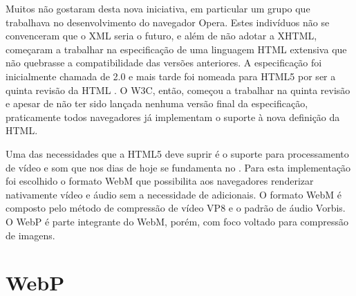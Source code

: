 \documentclass[espaco=simples,appendix=Name]{abnt}
\begin{document}
\begin{description}
Muitos não gostaram desta nova iniciativa, em particular um grupo que trabalhava no desenvolvimento do navegador Opera. Estes indivíduos não se convenceram que o XML seria o futuro, e além de não adotar a XHTML, começaram a trabalhar na especificação de uma linguagem HTML extensiva que não quebrasse a compatibilidade das versões anteriores.  A especificação foi inicialmente chamada de  2.0 e mais tarde foi nomeada para HTML5 por ser a quinta revisão da HTML \cite{HTML5Intro}. O W3C, então, começou a trabalhar na quinta revisão e apesar de não ter sido lançada nenhuma versão final da especificação, praticamente todos navegadores já implementam o suporte à nova definição da HTML.

Uma das necessidades que a HTML5 deve suprir é o suporte para processamento de vídeo e som que nos dias de hoje se fundamenta no . Para esta implementação foi escolhido o formato WebM que possibilita aos navegadores renderizar nativamente vídeo e áudio sem a necessidade de  adicionais. O formato WebM é composto pelo método de compressão de vídeo VP8 e o padrão de áudio Vorbis. O WebP é parte integrante do WebM, porém, com foco voltado para compressão de imagens.

\end{description}

\chapter{WebP}
\end{document}
